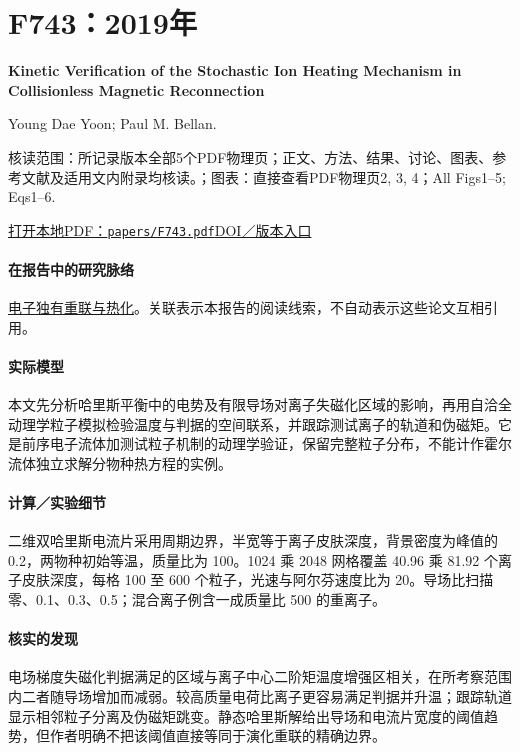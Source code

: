 \documentclass[UTF8,a4paper,11pt,openany,fontset=fandol]{ctexbook}
\begin{document}
\section{F743：2019年}\label{paper:F743}

\textbf{Kinetic Verification of the Stochastic Ion Heating Mechanism in Collisionless Magnetic Reconnection}\citep{F743}\

Young Dae Yoon;  Paul M. Bellan.

\textsf{核读范围：}所记录版本全部5个PDF物理页；正文、方法、结果、讨论、图表、参考文献及适用文内附录均核读。；\textsf{图表：}直接查看PDF物理页2, 3, 4；All Figs1–5;  Eqs1–6.

\href{run:../papers/F743.pdf}{打开本地PDF：\texttt{papers/F743.pdf}}\quad\href{https://doi.org/10.3847/2041-8213/ab5b0a}{DOI／版本入口}

\paragraph{在报告中的研究脉络}\hyperref[story:energy]{电子独有重联与热化}。关联表示本报告的阅读线索，不自动表示这些论文互相引用。

\paragraph{实际模型}本文先分析哈里斯平衡中的电势及有限导场对离子失磁化区域的影响，再用自洽全动理学粒子模拟检验温度与判据的空间联系，并跟踪测试离子的轨道和伪磁矩。它是前序电子流体加测试粒子机制的动理学验证，保留完整粒子分布，不能计作霍尔流体独立求解分物种热方程的实例。

\paragraph{计算／实验细节}二维双哈里斯电流片采用周期边界，半宽等于离子皮肤深度，背景密度为峰值的 0.2，两物种初始等温，质量比为 100。1024 乘 2048 网格覆盖 40.96 乘 81.92 个离子皮肤深度，每格 100 至 600 个粒子，光速与阿尔芬速度比为 20。导场比扫描零、0.1、0.3、0.5；混合离子例含一成质量比 500 的重离子。

\paragraph{核实的发现}电场梯度失磁化判据满足的区域与离子中心二阶矩温度增强区相关，在所考察范围内二者随导场增加而减弱。较高质量电荷比离子更容易满足判据并升温；跟踪轨道显示相邻粒子分离及伪磁矩跳变。静态哈里斯解给出导场和电流片宽度的阈值趋势，但作者明确不把该阈值直接等同于演化重联的精确边界。
\end{document}
